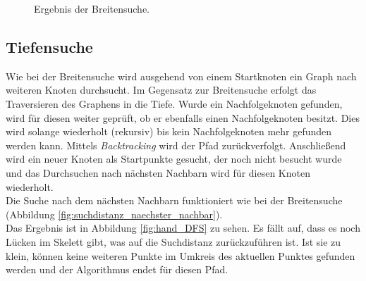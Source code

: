 \begin{figure}[htbp]
\begin{minipage}{5cm}
	\end{minipage}
	\caption{Ergebnis der Breitensuche.}
	\label{fig:hand_BFS}
	\end{figure}
\FloatBarrier
\subsection{Tiefensuche}
\label{subsec:tiefensuche}
Wie bei der Breitensuche wird ausgehend von einem Startknoten ein Graph nach weiteren Knoten durchsucht. 
Im Gegensatz zur Breitensuche erfolgt das Traversieren des Graphens in die Tiefe. Wurde ein Nachfolgeknoten
gefunden, wird für diesen weiter geprüft, ob er ebenfalls einen Nachfolgeknoten besitzt. Dies wird
solange wiederholt (rekursiv) bis kein Nachfolgeknoten mehr gefunden werden kann. Mittels \emph{Backtracking} wird der Pfad zurückverfolgt. Anschließend wird ein neuer Knoten als Startpunkte gesucht, der noch nicht besucht wurde und das Durchsuchen nach nächsten Nachbarn wird für diesen Knoten wiederholt.\\
Die Suche nach dem nächsten Nachbarn funktioniert wie bei der Breitensuche (Abbildung \ref{fig:suchdistanz_naechster_nachbar}). \\
Das Ergebnis ist in Abbildung \ref{fig:hand_DFS} zu sehen. Es fällt auf, dass es noch Lücken im Skelett gibt, was auf die Suchdistanz zurückzuführen ist. Ist sie zu klein, können keine weiteren Punkte im Umkreis des aktuellen Punktes gefunden werden und der Algorithmus endet für diesen Pfad. 
